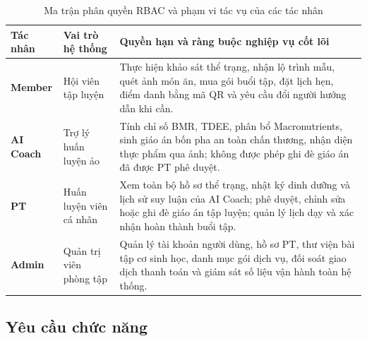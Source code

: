 \begin{table}[htbp]
\centering
\caption{Ma trận phân quyền RBAC và phạm vi tác vụ của các tác nhân}
\label{tab:rbac}
\begin{tabularx}{\textwidth}{l >{\raggedright\arraybackslash}p{3.4cm} >{\raggedright\arraybackslash}X}
    \toprule
    \textbf{Tác nhân} & \textbf{Vai trò hệ thống} & \textbf{Quyền hạn và ràng buộc nghiệp vụ cốt lõi} \\
    \midrule
    \textbf{Member} & Hội viên tập luyện & Thực hiện khảo sát thể trạng, nhận lộ trình mẫu, quét ảnh món ăn, mua gói buổi tập, đặt lịch hẹn, điểm danh bằng mã QR và yêu cầu đổi người hướng dẫn khi cần. \\
    \textbf{AI Coach} & Trợ lý huấn luyện ảo & Tính chỉ số BMR, TDEE, phân bổ Macronutrients, sinh giáo án bốn pha an toàn chấn thương, nhận diện thực phẩm qua ảnh; không được phép ghi đè giáo án đã được PT phê duyệt. \\
    \textbf{PT} & Huấn luyện viên cá nhân & Xem toàn bộ hồ sơ thể trạng, nhật ký dinh dưỡng và lịch sử suy luận của AI Coach; phê duyệt, chỉnh sửa hoặc ghi đè giáo án tập luyện; quản lý lịch dạy và xác nhận hoàn thành buổi tập. \\
    \textbf{Admin} & Quản trị viên phòng tập & Quản lý tài khoản người dùng, hồ sơ PT, thư viện bài tập cơ sinh học, danh mục gói dịch vụ, đối soát giao dịch thanh toán và giám sát số liệu vận hành toàn hệ thống. \\
    \bottomrule
\end{tabularx}
\end{table}

\subsection{Yêu cầu chức năng}
\label{subsec:yeucau_chucnang}

